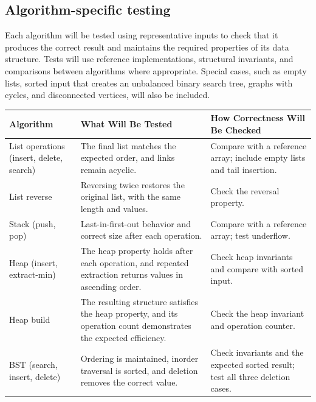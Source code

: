 \documentclass[11pt,a4paper]{article}
\renewcommand{\arraystretch}{1.06}
\begin{document}
\subsection{Algorithm-specific testing} 

Each algorithm will be tested using representative inputs to check that it produces the correct result and maintains the required properties of its data structure. Tests will use reference implementations, structural invariants, and comparisons between algorithms where appropriate. Special cases, such as empty lists, sorted input that creates an unbalanced binary search tree, graphs with cycles, and disconnected vertices, will also be included. 



\begin{table}[H]
\centering
\small
\renewcommand{\arraystretch}{1.3}
\begin{tabularx}{\textwidth}{
    @{}
    >{\raggedright\arraybackslash}p{}
    >{\raggedright\arraybackslash}X
    >{\raggedright\arraybackslash}X
    @{}
}
\toprule
\textbf{Algorithm} &
\textbf{What Will Be Tested} &
\textbf{How Correctness Will Be Checked} \\
\midrule

List operations (insert, delete, search) &
The final list matches the expected order, and links remain acyclic. &
Compare with a reference array; include empty lists and tail insertion. \\

List reverse &
Reversing twice restores the original list, with the same length and values. &
Check the reversal property. \\

Stack (push, pop) &
Last-in-first-out behavior and correct size after each operation. &
Compare with a reference array; test underflow. \\

Heap (insert, extract-min) &
The heap property holds after each operation, and repeated extraction returns values in ascending order. &
Check heap invariants and compare with sorted input. \\

Heap build &
The resulting structure satisfies the heap property, and its operation count demonstrates the expected efficiency. &
Check the heap invariant and operation counter. \\

BST (search, insert, delete) &
Ordering is maintained, inorder traversal is sorted, and deletion removes the correct value. &
Check invariants and the expected sorted result; test all three deletion cases. \\


\end{tabularx}
\end{table}
\end{document}
